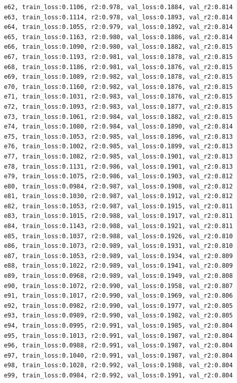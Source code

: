\documentclass[a4paper, 12pt]{article}
\begin{document}
\begin{lstlisting}
	e62, train_loss:0.1106, r2:0.978, val_loss:0.1884, val_r2:0.814
	e63, train_loss:0.1114, r2:0.978, val_loss:0.1893, val_r2:0.814
	e64, train_loss:0.1055, r2:0.979, val_loss:0.1892, val_r2:0.814
	e65, train_loss:0.1163, r2:0.980, val_loss:0.1886, val_r2:0.814
	e66, train_loss:0.1090, r2:0.980, val_loss:0.1882, val_r2:0.815
	e67, train_loss:0.1193, r2:0.981, val_loss:0.1878, val_r2:0.815
	e68, train_loss:0.1186, r2:0.981, val_loss:0.1876, val_r2:0.815
	e69, train_loss:0.1089, r2:0.982, val_loss:0.1878, val_r2:0.815
	e70, train_loss:0.1160, r2:0.982, val_loss:0.1876, val_r2:0.815
	e71, train_loss:0.1031, r2:0.983, val_loss:0.1876, val_r2:0.815
	e72, train_loss:0.1093, r2:0.983, val_loss:0.1877, val_r2:0.815
	e73, train_loss:0.1061, r2:0.984, val_loss:0.1882, val_r2:0.815
	e74, train_loss:0.1080, r2:0.984, val_loss:0.1890, val_r2:0.814
	e75, train_loss:0.1053, r2:0.985, val_loss:0.1896, val_r2:0.813
	e76, train_loss:0.1002, r2:0.985, val_loss:0.1899, val_r2:0.813
	e77, train_loss:0.1082, r2:0.985, val_loss:0.1901, val_r2:0.813
	e78, train_loss:0.1131, r2:0.986, val_loss:0.1901, val_r2:0.813
	e79, train_loss:0.1075, r2:0.986, val_loss:0.1903, val_r2:0.812
	e80, train_loss:0.0984, r2:0.987, val_loss:0.1908, val_r2:0.812
	e81, train_loss:0.1030, r2:0.987, val_loss:0.1912, val_r2:0.812
	e82, train_loss:0.1053, r2:0.987, val_loss:0.1915, val_r2:0.811
	e83, train_loss:0.1015, r2:0.988, val_loss:0.1917, val_r2:0.811
	e84, train_loss:0.1143, r2:0.988, val_loss:0.1921, val_r2:0.811
	e85, train_loss:0.1037, r2:0.988, val_loss:0.1926, val_r2:0.810
	e86, train_loss:0.1073, r2:0.989, val_loss:0.1931, val_r2:0.810
	e87, train_loss:0.1053, r2:0.989, val_loss:0.1934, val_r2:0.809
	e88, train_loss:0.1022, r2:0.989, val_loss:0.1941, val_r2:0.809
	e89, train_loss:0.0968, r2:0.989, val_loss:0.1949, val_r2:0.808
	e90, train_loss:0.1072, r2:0.990, val_loss:0.1958, val_r2:0.807
	e91, train_loss:0.1017, r2:0.990, val_loss:0.1969, val_r2:0.806
	e92, train_loss:0.0982, r2:0.990, val_loss:0.1977, val_r2:0.805
	e93, train_loss:0.0989, r2:0.990, val_loss:0.1982, val_r2:0.805
	e94, train_loss:0.0995, r2:0.991, val_loss:0.1985, val_r2:0.804
	e95, train_loss:0.1013, r2:0.991, val_loss:0.1987, val_r2:0.804
	e96, train_loss:0.0988, r2:0.991, val_loss:0.1987, val_r2:0.804
	e97, train_loss:0.1040, r2:0.991, val_loss:0.1987, val_r2:0.804
	e98, train_loss:0.1028, r2:0.992, val_loss:0.1988, val_r2:0.804
	e99, train_loss:0.0984, r2:0.992, val_loss:0.1991, val_r2:0.804
	
	\end{lstlisting}	
	
\end{document}

